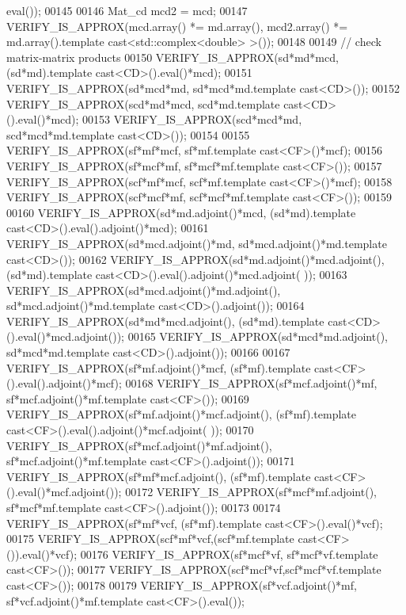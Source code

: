 \begin{DoxyCode}
      eval());
00145 
00146   Mat\_cd mcd2 = mcd;
00147   VERIFY\_IS\_APPROX(mcd.array() *= md.array(), mcd2.array() *= md.array().template cast<std::complex<double>
       >());
00148   
00149   \textcolor{comment}{// check matrix-matrix products}
00150   VERIFY\_IS\_APPROX(sd*md*mcd, (sd*md).\textcolor{keyword}{template} cast<CD>().eval()*mcd);
00151   VERIFY\_IS\_APPROX(sd*mcd*md, sd*mcd*md.template cast<CD>());
00152   VERIFY\_IS\_APPROX(scd*md*mcd, scd*md.template cast<CD>().eval()*mcd);
00153   VERIFY\_IS\_APPROX(scd*mcd*md, scd*mcd*md.template cast<CD>());
00154 
00155   VERIFY\_IS\_APPROX(sf*mf*mcf, sf*mf.template cast<CF>()*mcf);
00156   VERIFY\_IS\_APPROX(sf*mcf*mf, sf*mcf*mf.template cast<CF>());
00157   VERIFY\_IS\_APPROX(scf*mf*mcf, scf*mf.template cast<CF>()*mcf);
00158   VERIFY\_IS\_APPROX(scf*mcf*mf, scf*mcf*mf.template cast<CF>());
00159 
00160   VERIFY\_IS\_APPROX(sd*md.adjoint()*mcd, (sd*md).\textcolor{keyword}{template} cast<CD>().eval().adjoint()*mcd);
00161   VERIFY\_IS\_APPROX(sd*mcd.adjoint()*md, sd*mcd.adjoint()*md.template cast<CD>());
00162   VERIFY\_IS\_APPROX(sd*md.adjoint()*mcd.adjoint(), (sd*md).\textcolor{keyword}{template} cast<CD>().eval().adjoint()*mcd.adjoint(
      ));
00163   VERIFY\_IS\_APPROX(sd*mcd.adjoint()*md.adjoint(), sd*mcd.adjoint()*md.template cast<CD>().adjoint());
00164   VERIFY\_IS\_APPROX(sd*md*mcd.adjoint(), (sd*md).\textcolor{keyword}{template} cast<CD>().eval()*mcd.adjoint());
00165   VERIFY\_IS\_APPROX(sd*mcd*md.adjoint(), sd*mcd*md.template cast<CD>().adjoint());
00166 
00167   VERIFY\_IS\_APPROX(sf*mf.adjoint()*mcf, (sf*mf).\textcolor{keyword}{template} cast<CF>().eval().adjoint()*mcf);
00168   VERIFY\_IS\_APPROX(sf*mcf.adjoint()*mf, sf*mcf.adjoint()*mf.template cast<CF>());
00169   VERIFY\_IS\_APPROX(sf*mf.adjoint()*mcf.adjoint(), (sf*mf).\textcolor{keyword}{template} cast<CF>().eval().adjoint()*mcf.adjoint(
      ));
00170   VERIFY\_IS\_APPROX(sf*mcf.adjoint()*mf.adjoint(), sf*mcf.adjoint()*mf.template cast<CF>().adjoint());
00171   VERIFY\_IS\_APPROX(sf*mf*mcf.adjoint(), (sf*mf).\textcolor{keyword}{template} cast<CF>().eval()*mcf.adjoint());
00172   VERIFY\_IS\_APPROX(sf*mcf*mf.adjoint(), sf*mcf*mf.template cast<CF>().adjoint());
00173 
00174   VERIFY\_IS\_APPROX(sf*mf*vcf, (sf*mf).\textcolor{keyword}{template} cast<CF>().eval()*vcf);
00175   VERIFY\_IS\_APPROX(scf*mf*vcf,(scf*mf.template cast<CF>()).eval()*vcf);
00176   VERIFY\_IS\_APPROX(sf*mcf*vf, sf*mcf*vf.template cast<CF>());
00177   VERIFY\_IS\_APPROX(scf*mcf*vf,scf*mcf*vf.template cast<CF>());
00178 
00179   VERIFY\_IS\_APPROX(sf*vcf.adjoint()*mf,  sf*vcf.adjoint()*mf.template cast<CF>().eval());

\end{DoxyCode}
